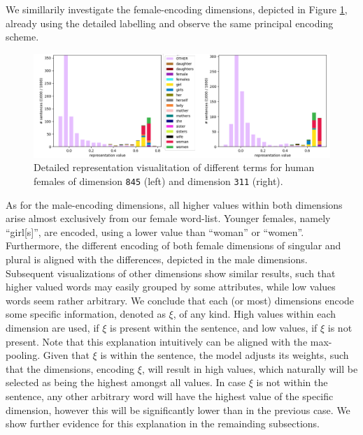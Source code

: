 \noindent
We simillarily investigate the female-encoding dimensions, depicted in Figure \ref{fig:mf_detailed_f}, already using the detailed labelling and observe the same principal encoding scheme. 
\begin{figure}[tph!]
\centering
	\includegraphics[totalheight=5cm]{fig/mf_detailed_f.png}
	\caption{Detailed representation visualitation of different terms for human females of dimension \texttt{845} (left) and dimension \texttt{311} (right).}
	\label{fig:mf_detailed_f}
\end{figure}
As for the male-encoding dimensions, all higher values within both dimensions arise almost exclusively from our female word-list. Younger females, namely ``girl[s]'', are encoded, using a lower value than ``woman'' or ``women''. Furthermore, the different encoding of both female dimensions of singular and plural is aligned with the differences, depicted in the male dimensions. Subsequent visualizations of other dimensions show similar results, such that higher valued words may easily grouped by some attributes, while low values words seem rather arbitrary. We conclude that each (or most) dimensions encode some specific information, denoted as $\xi$, of any kind. High values within each dimension are used, if $\xi$ is present within the sentence, and low values, if $\xi$ is not present. Note that this explanation intuitively can be aligned with the max-pooling. Given that $\xi$ is within the sentence, the model adjusts its weights, such that the dimensions, encoding $\xi$, will result in high values, which naturally will be selected as being the highest amongst all values. In case $\xi$ is not within the sentence, any other arbitrary word will have the highest value of the specific dimension, however this will be significantly lower than in the previous case. We show further evidence for this explanation in the remainding subsections.

